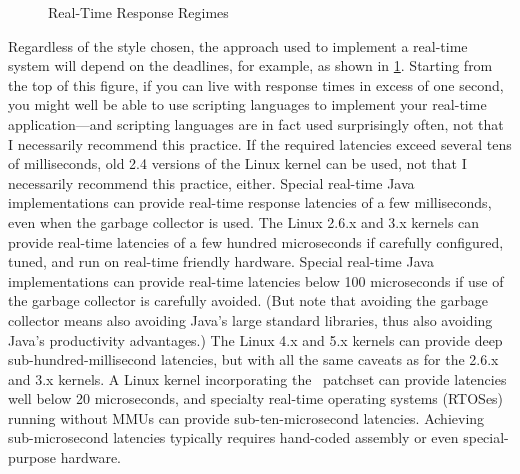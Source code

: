 \begin{figure}
\centering
{}
\caption{Real-Time Response Regimes}
\label{fig:advsync:Real-Time Response Regimes}
\end{figure}

Regardless of the style chosen, the approach used to implement a real-time
system will depend on the deadlines, for example, as shown in
\cref{fig:advsync:Real-Time Response Regimes}.
Starting from the top of this figure, if you can live with response times in
excess of one second, you might well be able to use scripting languages
to implement your real-time application---and scripting languages are
in fact used surprisingly often, not that I necessarily recommend this
practice.
If the required latencies exceed several tens of milliseconds,
old 2.4 versions of the Linux kernel can be used, not that I necessarily
recommend this practice, either.
Special real-time Java implementations can provide real-time response
latencies of a few milliseconds, even when the garbage collector is
used.
The Linux 2.6.x and 3.x kernels can provide real-time latencies of
a few hundred microseconds if carefully configured, tuned, and run
on real-time friendly hardware.
Special real-time Java implementations can provide real-time latencies
below 100 microseconds if use of the garbage collector is carefully avoided.
(But note that avoiding the garbage collector means also avoiding
Java's large standard libraries, thus also avoiding Java's productivity
advantages.)
The Linux 4.x and 5.x kernels can provide deep sub-hundred-millisecond
latencies, but with all the same caveats as for the 2.6.x and 3.x kernels.
A Linux kernel incorporating the \rt\ patchset can provide latencies
well below 20 microseconds, and specialty real-time operating systems (RTOSes)
running without MMUs can provide sub-ten-microsecond
latencies.
Achieving sub-microsecond latencies typically requires hand-coded assembly
or even special-purpose hardware.

